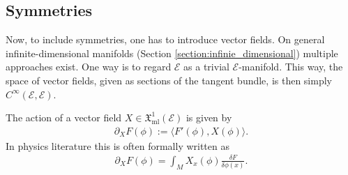 \subsection{Symmetries}

    Now, to include symmetries, one has to introduce vector fields. On general infinite-dimensional manifolds (Section \ref{section:infinie_dimensional}) multiple approaches exist. One way is to regard $\mathcal{E}$ as a trivial $\mathcal{E}$-manifold. This way, the space of vector fields, given as sections of the tangent bundle, is then simply $C^\infty(\mathcal{E},\mathcal{E})$.

    The action of a vector field $X\in\mathfrak{X}^1_\mathrm{ml}(\mathcal{E})$ is given by
    \begin{gather}
        \partial_XF(\phi) := \langle F'(\phi),X(\phi) \rangle.
    \end{gather}
    In physics literature this is often formally written as
    \begin{gather}
        \partial_XF(\phi) = \int_MX_x(\phi)\frac{\delta F}{\delta\phi(x)}.
    \end{gather}

